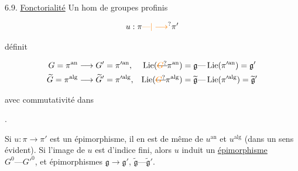 6.9. \uline{Fonctorialité} Un hom de groupes profinis

\[
u:\pi\unsure{\text{---}|\longrightarrow}\pi'
\]

définit

\[
\begin{aligned}
G=\pi^{\mathrm{an}}&\longrightarrow G'=\pi'^{\mathrm{an}},&\operatorname{Lie}(\deleted{\unsure{G}}\pi^{\mathrm{an}})=\mathfrak g&\text{---}\operatorname{Lie}(\pi'^{\mathrm{an}})=\mathfrak g'\\
\widetilde G=\pi^{\mathrm{alg}}&\longrightarrow\widetilde G'=\pi'^{\mathrm{alg}},&\operatorname{Lie}(\deleted{\unsure{G}}\pi^{\mathrm{alg}})=\widetilde{\mathfrak g}&\text{---}\operatorname{Lie}(\pi'^{\mathrm{alg}})=\widetilde{\mathfrak g}'
\end{aligned}
\]

avec commutativité dans



 .

Si $u:\pi\longrightarrow\pi'$ est un épimorphisme, il en est de même de $u^{\mathrm{an}}$ et $u^{\mathrm{alg}}$ (dans un sens évident). Si l'image de $u$ est d'indice fini, alors $u$ induit un \uline{épimorphisme} $G^0\text{---}G'^0$, et  épimorphismes $\mathfrak g\longrightarrow\mathfrak g'$, $\widetilde{\mathfrak g}\text{---}\widetilde{\mathfrak g}'$.

